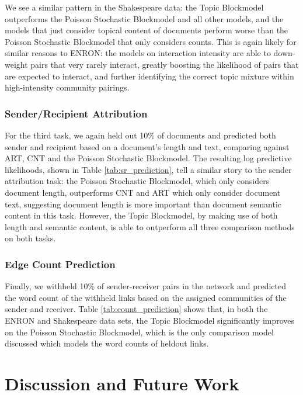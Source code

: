         We see a similar pattern in the Shakespeare data: the Topic Blockmodel  outperforms the Poisson Stochastic Blockmodel and all other models, and the models that just consider topical content of documents perform worse than the Poisson Stochastic Blockmodel that only considers counts.  This is again likely for similar reasons to ENRON: the models on interaction intensity are able to down-weight pairs that very rarely interact, greatly boosting the likelihood of pairs that are expected to interact, and further identifying the correct topic mixture within high-intensity community pairings.

    \subsubsection{Sender/Recipient Attribution}
    
        For the third task, we again held out 10\% of documents and  predicted both sender and recipient based on a document's length and text, comparing against ART, CNT and the Poisson Stochastic Blockmodel. The resulting log predictive likelihoods, shown in Table \ref{tab:sr_prediction}, tell a similar story to the sender attribution task: the Poisson Stochastic Blockmodel, which only considers document length, outperforms CNT and ART which only consider document text, suggesting document length is more important than document semantic content in this task. However, the Topic Blockmodel, by making use of both length and semantic content, is able to outperform all three comparison methods on both tasks.
    
    \subsubsection{Edge Count Prediction}
    
        Finally, we withheld 10\% of sender-receiver pairs in the network and predicted the word count of the withheld links based on the assigned communities of the sender and receiver.  Table \ref{tab:count_prediction} shows that, in both the ENRON and Shakespeare data sets, the Topic Blockmodel significantly improves on the Poisson Stochastic Blockmodel, which is the only comparison model discussed which models the word counts of heldout links.
    
\section{Discussion and Future Work}\label{sec:conclusion}
    
